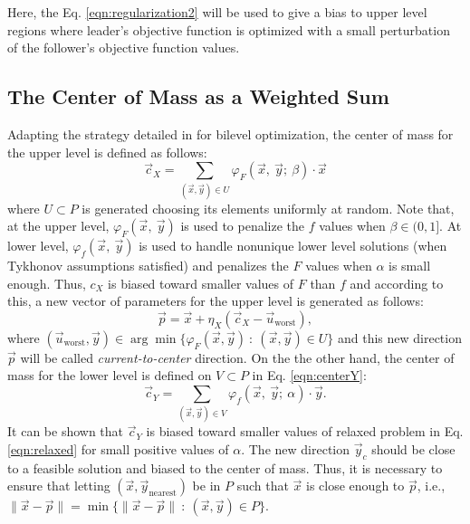 \documentclass[conference]{IEEEtran}
\theoremstyle{definition}
\begin{document}
Here, the Eq. \ref{eqn:regularization2} will be used to give a bias to upper level
regions where leader's objective function is optimized with a small perturbation
of the follower's objective function values. 

\subsection{The Center of Mass as a Weighted Sum} %
\label{sub:the_center_of_mass_as_a_weighted_sum}
% 
Adapting the strategy detailed in \cite{Mejia2018} for bilevel optimization, the
center of mass for the upper level is defined as follows:
% 
\begin{equation}
    \vec{c}_X = \sum_{(\vec{x}, \vec{y})\in U} \varphi_F(\vec{x},\ \vec{y}; \ \beta) \cdot \vec{x}
    \label{eqn:centerX}
\end{equation}
% 
where $U \subset P$ is generated choosing its elements uniformly at random.
Note that, at the upper level, $\varphi_F (\vec{x},\ \vec{y})$ is used to penalize
the $f$ values when $\beta\in (0, 1]$. At lower level, $\varphi_f (\vec{x},\ \vec{y})$
is used to handle nonunique lower level solutions (when Tykhonov assumptions 
satisfied) and penalizes the $F$ values when $\alpha$ is small enough. Thus, $c_X$
is biased toward smaller values of $F$ than $f$ and according to this, a new vector
of parameters for the upper level is generated as follows:
% 
\begin{equation}
    \vec{p} = \vec{x} + \eta_{X} (\vec{c}_X - \vec{u}_{\text{worst}}),
	\label{eqn:leaderp}
\end{equation}
% 
where
$
    (\vec{u}_{\text{worst}}, \vec{y}) \in \arg \min \{\varphi_F(\vec{x}, \vec{y} )  \ : \ (\vec{x}, \vec{y}) \in U \} 
$ %
% 
and this new direction $\vec{p}$ will be called \textit{current-to-center} direction. %
On the the other hand, the center of mass for the lower level is defined on
$V \subset P$ in Eq. \ref{eqn:centerY}:
% 
\begin{equation}
    \vec{c}_Y = \sum_{(\vec{x}, \vec{y})\in V} \varphi_f(\vec{x},\ \vec{y};\ \alpha) \cdot \vec{y}.
    \label{eqn:centerY}
\end{equation}
% 
It can be shown that $\vec{c}_Y$ is biased toward smaller values of relaxed
problem in Eq. \ref{eqn:relaxed} for small positive values of $\alpha$.
% 
The new direction $\vec{y}_c$ should be close to a feasible solution and biased
to the center of mass. Thus, it is necessary to ensure that letting $(\vec{x}, \vec{y}_{\text{nearest}}) $
be in $P$ such that $\vec{x}$ is close enough to $\vec{p}$, i.e., $ \| \vec{x} - \vec{p} \| = \min\{ \| \vec{x} - \vec{p} \| \ : \ (\vec{x}, \vec{y}) \in P  \} $.
\end{document}
